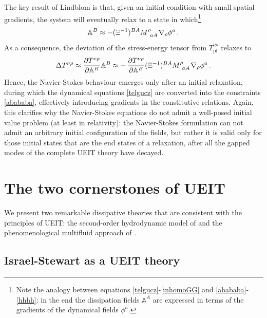 \documentclass[a4paper, amsfonts, amssymb, amsmath, reprint, twocolumn, showkeys, nofootinbib]{revtex4-2}
\begin{document}
The key result of Lindblom is that, given an initial condition with small spatial gradients, the system will eventually relax to a state in which\footnote{
Note the analogy between equations \eqref{telgucz}-\eqref{inhomoGG} and 
\eqref{abababa}-\eqref{hhhh}: in the end the dissipation fields $\mathbb{A}^A$ are expressed in terms of the gradients of the dynamical fields $\phi^a$. 
}
\begin{equation}\label{abababa}
\mathbb{A}^B \approx - (\Xi^{-1})^{BA} M\indices{^\rho _a _A} \nabla_\rho \phi^a \, .
\end{equation}
As a consequence, the deviation of the stress-energy tensor from  $T_{\text{pf}}^{\nu \rho}$ relaxes to
\begin{equation}
\Delta T^{\nu \rho} \approx \dfrac{\partial T^{\nu \rho}}{\partial \mathbb{A}^B} \mathbb{A}^B 
\approx 
- \, \dfrac{\partial T^{\nu \rho}}{\partial \mathbb{A}^B} (\Xi^{-1})^{BA} M\indices{^\rho _a _A} \nabla_\rho \phi^a \, .
\end{equation}
Hence, the Navier-Stokes behaviour emerges only after an initial relaxation, during which the dynamical equations \eqref{telgucz} are converted into the constraints \eqref{abababa}, effectively introducing gradients in the constitutive relations. Again, this clarifies why the Navier-Stokes equations do not admit a well-posed initial value problem (at least in relativity): the Navier-Stokes formulation can not admit an arbitrary initial configuration of the fields, but rather it is valid  only for those initial states that are the end states of a relaxation, after all the gapped modes of the complete UEIT theory have decayed.  

\section{The two cornerstones of UEIT}
\label{JonasLatinista}

We present two remarkable dissipative theories that are consistent with the principles of UEIT: the second-order hydrodynamic model of \citet{Israel_Stewart_1979} and the phenomenological multifluid approach of \citet{Carter_starting_point}.

\subsection{Israel-Stewart as a UEIT theory}
\end{document}
